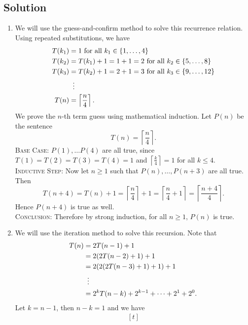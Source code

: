 \documentclass{article}
\begin{document}
\subsection*{Solution}
    \begin{enumerate}
        \item We will use the guess-and-confirm method to solve this recurrence relation. Using repeated substitutions, we have 
        $$\begin{aligned}[t]
            T(k_{1}) &= 1 \text{ for all } k_{1} \in \{1, \dots, 4\} \\
            T(k_{2}) &= T(k_{1}) + 1 = 1 + 1 = 2 \text{ for all } k_{2} \in \{5, \dots, 8\} \\
            T(k_{3}) &= T(k_{2}) + 1 = 2 + 1 = 3 \text{ for all } k_{3} \in \{9, \dots, 12\} \\
            &\vdotswithin{ = } \\
            T(n) &= \left \lceil \frac{n}{4} \right \rceil.
        \end{aligned}$$
        We prove the $n$-th term guess using mathematical induction. Let $P(n)$ be the sentence $$T(n) = \left \lceil \frac{n}{4} \right \rceil.$$
        \textsc{Base Case}: $P(1), \dots P(4)$ are all true, since $T(1) = T(2) = T(3) = T(4) = 1$ and $\left \lceil \frac{k}{4} \right \rceil = 1$ for all $k \le 4$. \\
        \textsc{Inductive Step}: Now let $n \ge 1$ such that $P(n), \dots, P(n + 3)$ are all true. Then $$T(n + 4) = T(n) + 1 = \left \lceil \frac{n}{4} \right \rceil + 1 = \left \lceil \frac{n}{4} + 1 \right \rceil = \left \lceil \frac{n + 4}{4} \right \rceil.$$ Hence $P(n + 4)$ is true as well. \\
        \textsc{Conclusion}: Therefore by strong induction, for all $n \ge 1$, $P(n)$ is true.
        \item We will use the iteration method to solve this recursion. Note that 
        $$\begin{aligned}[t]
            T(n) &= 2T(n - 1) + 1 \\
            &= 2(2T(n - 2) + 1) + 1 \\
            &= 2(2(2T(n - 3) + 1) + 1) + 1\\
            &\vdotswithin{ = } \\
            &= 2^{k}T(n - k) + 2^{k - 1} + \dots + 2^{1} + 2^{0}.
        \end{aligned}$$
        Let $k = n - 1$, then $n - k = 1$ and we have
        $$\begin{aligned}[t]

\end{aligned}$$
\end{enumerate}
\end{document}

